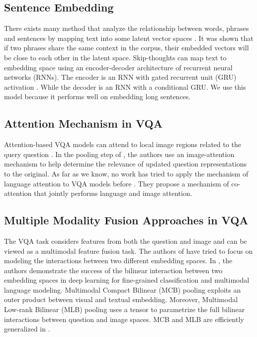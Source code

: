 \documentclass[letterpaper]{article}
\begin{document}
\subsection{Sentence Embedding}
There exists many method that analyze the relationship between words, phrases and sentences by mapping text into some latent vector spaces \cite{11,43,47}. It was shown that if two phrases share the same context in the corpus, their embedded vectors will be close to each other in the latent space. Skip-thoughts \cite{43} can map text to embedding space using an encoder-decoder architecture of recurrent neural networks (RNNs). The encoder is an RNN with gated recurrent unit (GRU) activation \cite{10}. While the decoder is an RNN with a conditional GRU. We use this model because it performs well on embedding long sentences.

\subsection{Attention Mechanism in VQA}
Attention-based VQA models can attend to local image regions related to the query question \cite{13,15,35,42}. In the pooling step of \cite{42}, the authors use an image-attention mechanism to help determine the relevance of updated question representations to the original. As far as we know, no work has tried to apply the mechanism of language attention to VQA models before \cite{41}. They propose a mechanism of co-attention that jointly performs language and image attention.

\subsection{Multiple Modality Fusion Approaches in VQA}
The VQA task considers features from both the question and image and can be viewed as a multimodal feature fusion task. The authors of \cite{26,57,58,59} have tried to focus on modeling the interactions between two different embedding spaces. In \cite{26}, the authors demonstrate the success of the bilinear interaction between two embedding spaces in deep learning for fine-grained classification and multimodal language modeling. Multimodal Compact Bilinear (MCB) pooling \cite{58} exploits an outer product between visual and textual embedding. Moreover, Multimodal Low-rank Bilinear (MLB) pooling \cite{59} uses a tensor to parametrize the full bilinear interactions between question and image spaces. MCB and MLB are efficiently generalized in \cite{57}.
\end{document}
